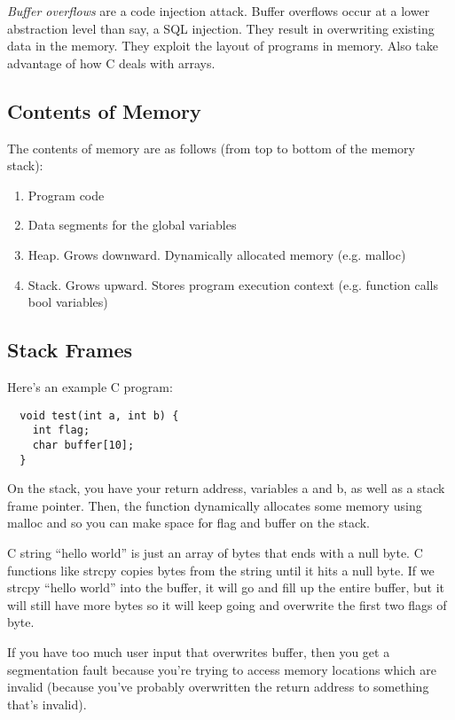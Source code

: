 \documentclass[psamsfonts]{amsart}
\begin{document}
\emph{Buffer overflows} are a code injection attack. Buffer overflows occur at a lower abstraction level than say, a SQL injection. They result in overwriting existing data in the memory. They exploit the layout of programs in memory. Also take advantage of how C deals with arrays.

\subsection{Contents of Memory}

The contents of memory are as follows (from top to bottom of the memory stack):
\begin{enumerate}
  \item Program code
  \item Data segments for the global variables
  \item Heap. Grows downward. Dynamically allocated memory (e.g. malloc)
  \item Stack. Grows upward. Stores program execution context (e.g. function calls bool variables)
\end{enumerate}

\subsection{Stack Frames}

Here's an example C program:

\begin{verbatim}
  void test(int a, int b) {
    int flag;
    char buffer[10];
  }
\end{verbatim}

On the stack, you have your return address, variables a and b, as well as a stack frame pointer. Then, the function dynamically allocates some memory using malloc and so you can make space for flag and buffer on the stack.

C string ``hello world'' is just an array of bytes that ends with a null byte. C functions like strcpy copies bytes from the string until it hits a null byte. If we strcpy ``hello world'' into the buffer, it will go and fill up the entire buffer, but it will still have more bytes so it will keep going and overwrite the first two flags of byte.

If you have too much user input that overwrites buffer, then you get a segmentation fault because you're trying to access memory locations which are invalid (because you've probably overwritten the return address to something that's invalid).
\end{document}

